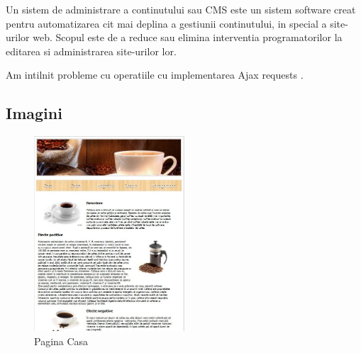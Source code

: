 Un sistem de administrare a continutului sau CMS este un sistem software creat pentru automatizarea cit mai deplina a gestiunii continutului, in special a site-urilor web. Scopul este de a reduce sau elimina interventia programatorilor la editarea si administrarea site-urilor lor.


Am intilnit probleme cu operatiile cu implementarea Ajax requests .  
 



\subsection{Imagini}




\begin{figure}[!ht]
	
	\centering
	
	\includegraphics[width=0.5\textwidth]{Cattura.JPG}
	
	\caption{Pagina Casa}
	
	\label{Im_label}
	
\end{figure}

